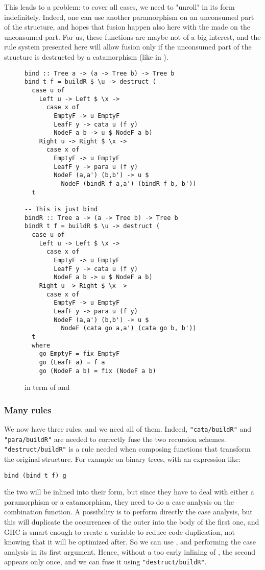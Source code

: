 This leads to a problem: to cover all cases, we need to "unroll"  in its  form indefinitely. Indeed, one can use another paramorphism on an unconsumed part of the structure, and hopes that fusion happen also here with the  made on the unconsumed part. For us, these functions are maybe not of a big interest, and the rule system presented here will allow fusion only if the unconsumed part of the structure is destructed by a catamorphism (like in ).

\begin{figure}
\begin{verbatim}
bind :: Tree a -> (a -> Tree b) -> Tree b
bind t f = buildR $ \u -> destruct (
  case u of
    Left u -> Left $ \x ->
      case x of
        EmptyF -> u EmptyF
        LeafF y -> cata u (f y)
        NodeF a b -> u $ NodeF a b)
    Right u -> Right $ \x ->
      case x of
        EmptyF -> u EmptyF
        LeafF y -> para u (f y)
        NodeF (a,a') (b,b') -> u $
          NodeF (bindR f a,a') (bindR f b, b'))
  t

-- This is just bind
bindR :: Tree a -> (a -> Tree b) -> Tree b
bindR t f = buildR $ \u -> destruct (
  case u of
    Left u -> Left $ \x ->
      case x of
        EmptyF -> u EmptyF
        LeafF y -> cata u (f y)
        NodeF a b -> u $ NodeF a b)
    Right u -> Right $ \x ->
      case x of
        EmptyF -> u EmptyF
        LeafF y -> para u (f y)
        NodeF (a,a') (b,b') -> u $
          NodeF (cata go a,a') (cata go b, b'))
  t
  where
    go EmptyF = fix EmptyF
    go (LeafF a) = f a
    go (NodeF a b) = fix (NodeF a b)

\end{verbatim}
\caption{ in term of  and }
\label{fig:bindbuild}
\end{figure}

\subsubsection{Many rules}
We now have three rules, and we need all of them. Indeed, \verb|"cata/buildR"| and \verb|"para/buildR"| are needed to correctly fuse the two recursion schemes. \verb|"destruct/buildR"| is a rule needed when composing functions that transform the original structure. For example on binary trees, with an expression like:
\begin{verbatim}
bind (bind t f) g
\end{verbatim}
\noindent the two  will be inlined into their  form, but since they have to deal with either a paramorphism or a catamorphism, they need to do a case analysis on the combination function. A possibility is to perform directly the case analysis, but this will duplicate the occurrences of the outer  into the body of the first one, and GHC is smart enough to create a variable to reduce code duplication, not knowing that it will be optimized after. So we can use , and performing the case analysis in its first argument. Hence, without a too early inlining of , the second  appears only once, and we can fuse it using \verb|"destruct/buildR"|.

